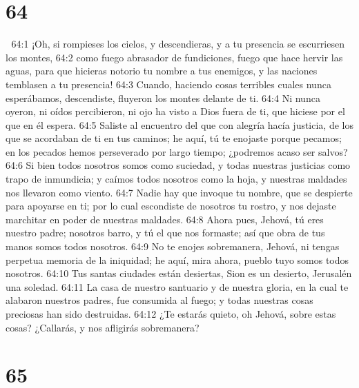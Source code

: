 \chapter{64}


64:1 ¡Oh, si rompieses los cielos, y descendieras, y a tu presencia se escurriesen los montes,  
64:2 como fuego abrasador de fundiciones, fuego que hace hervir las aguas, para que hicieras notorio tu nombre a tus enemigos, y las naciones temblasen a tu presencia!  
64:3 Cuando, haciendo cosas terribles cuales nunca esperábamos, descendiste, fluyeron los montes delante de ti.  
64:4 Ni nunca oyeron, ni oídos percibieron, ni ojo ha visto a Dios fuera de ti, que hiciese por el que en él espera. 
64:5 Saliste al encuentro del que con alegría hacía justicia, de los que se acordaban de ti en tus caminos; he aquí, tú te enojaste porque pecamos; en los pecados hemos perseverado por largo tiempo; ¿podremos acaso ser salvos?  
64:6 Si bien todos nosotros somos como suciedad, y todas nuestras justicias como trapo de inmundicia; y caímos todos nosotros como la hoja, y nuestras maldades nos llevaron como viento.  
64:7 Nadie hay que invoque tu nombre, que se despierte para apoyarse en ti; por lo cual escondiste de nosotros tu rostro, y nos dejaste marchitar en poder de nuestras maldades.  
64:8 Ahora pues, Jehová, tú eres nuestro padre; nosotros barro, y tú el que nos formaste; así que obra de tus manos somos todos nosotros.  
64:9 No te enojes sobremanera, Jehová, ni tengas perpetua memoria de la iniquidad; he aquí, mira ahora, pueblo tuyo somos todos nosotros.  
64:10 Tus santas ciudades están desiertas, Sion es un desierto, Jerusalén una soledad.  
64:11 La casa de nuestro santuario y de nuestra gloria, en la cual te alabaron nuestros padres, fue consumida al fuego; y todas nuestras cosas preciosas han sido destruidas.  
64:12 ¿Te estarás quieto, oh Jehová, sobre estas cosas? ¿Callarás, y nos afligirás sobremanera?  

\chapter{65}

